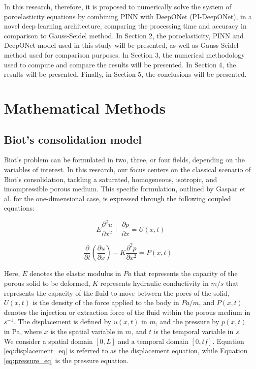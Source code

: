\documentclass[sn-mathphys]{sn-jnl}%
\theoremstyle{thmstyleone}%
\theoremstyle{thmstyletwo}%
\theoremstyle{thmstylethree}%
\begin{document}
In this research, therefore, it is proposed to numerically solve the system of poroelasticity equations by combining PINN with DeepONet (PI-DeepONet), in a novel deep learning architecture, comparing the processing time and accuracy in comparison to Gauss-Seidel method. In Section 2, the poroelasticity, PINN and DeepONet model used in this study will be presented, as well as Gauss-Seidel method used for comparison purposes. In Section 3, the numerical methodology used to compute and compare the results will be presented. In Section 4, the results will be presented. Finally, in Section 5, the conclusions will be presented.

\section{Mathematical Methods}\label{sec1} 

\subsection{Biot's consolidation model}

Biot's problem can be formulated in two, three, or four fields, depending on the variables of interest. In this research, our focus centers on the classical scenario of Biot's consolidation, tackling a saturated, homogeneous, isotropic, and incompressible porous medium. This specific formulation, outlined by Gaspar et al. \cite{gaspar2003finite,franco2018multigrid} for the one-dimensional case, is expressed through the following coupled equations:

\begin{equation}
\label{eq:displacement_eq}
-E\frac{\partial^2u}{\partial x^2} + \frac{\partial p}{\partial x} = U(x,t)
\end{equation}

\begin{equation}
\label{eq:pressure_eq}
\frac{\partial}{\partial t}\left(\frac{\partial u}{\partial x}\right) - K\frac{\partial^2p}{\partial x^2} = P(x,t)
\end{equation}

Here, \(E\) denotes the elastic modulus in \(Pa\) that represents the capacity of the porous solid to be deformed, \(K\) represents hydraulic conductivity in \(m/s\) that represents the capacity of the fluid to move between the pores of the solid, \(U(x,t)\) is the density of the force applied to the body in \(Pa/m\), and \(P(x,t)\) denotes the injection or extraction force of the fluid within the porous medium in \(s^{-1}\). The displacement is defined by \(u(x,t)\) in \(m\), and the pressure by \(p(x,t)\) in Pa, where \(x\) is the spatial variable in \(m\), and \(t\) is the temporal variable in \(s\). We consider a spatial domain \([0,L]\) and a temporal domain \([0,tf]\). Equation \ref{eq:displacement_eq} is referred to as the displacement equation, while Equation \ref{eq:pressure_eq} is the pressure equation.
\end{document}
